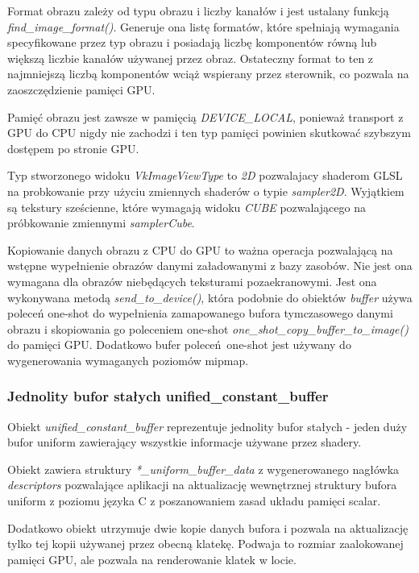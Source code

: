 Format obrazu zależy od typu obrazu i liczby kanałów i jest ustalany funkcją \textit{find\_image\_format()}.
Generuje ona listę formatów, które spełniają wymagania specyfikowane przez typ obrazu i posiadają liczbę komponentów równą lub większą liczbie kanałów używanej przez obraz.
Ostateczny format to ten z najmniejszą liczbą komponentów wciąż wspierany przez sterownik, co pozwala na zaoszczędzienie pamięci GPU.

Pamięć obrazu jest zawsze w pamięcią \textit{DEVICE\_LOCAL}, ponieważ transport z GPU do CPU nigdy nie zachodzi i ten typ pamięci powinien skutkować szybszym dostępem po stronie GPU.

Typ stworzonego widoku \textit{VkImageViewType} to \textit{2D} pozwalajacy shaderom GLSL na probkowanie przy użyciu zmiennych shaderów o typie \textit{sampler2D}. Wyjątkiem są tekstury sześcienne, które wymagają widoku \textit{CUBE} pozwalającego na próbkowanie zmiennymi \textit{samplerCube}.

Kopiowanie danych obrazu z CPU do GPU to ważna operacja pozwalającą na wstępne wypełnienie obrazów danymi załadowanymi z bazy zasobów. Nie jest ona wymagana dla obrazów niebędących teksturami pozaekranowymi.
Jest ona wykonywana metodą \textit{send\_to\_device()}, która podobnie do obiektów \textit{buffer} używa poleceń one-shot do wypełnienia zamapowanego bufora tymczasowego danymi obrazu i skopiowania go poleceniem one-shot \textit{one\_shot\_copy\_buffer\_to\_image()} do pamięci GPU.
Dodatkowo bufer poleceń one-shot jest używany do wygenerowania wymaganych poziomów mipmap.
 
\subsubsection{Jednolity bufor stałych unified\_constant\_buffer}
Obiekt \textit{unified\_constant\_buffer} reprezentuje jednolity bufor stałych - jeden duży bufor uniform zawierający wszystkie informacje używane przez shadery.

Obiekt zawiera struktury \textit{*\_uniform\_buffer\_data} z wygenerowanego nagłówka \textit{descriptors} pozwalające aplikacji na aktualizację wewnętrznej struktury bufora uniform z poziomu języka C z poszanowaniem zasad układu pamięci scalar.

Dodatkowo obiekt utrzymuje dwie kopie danych bufora i pozwala na aktualizację tylko tej kopii używanej przez obecną klatekę. Podwaja to rozmiar zaalokowanej pamięci GPU, ale pozwala na renderowanie klatek w locie.

